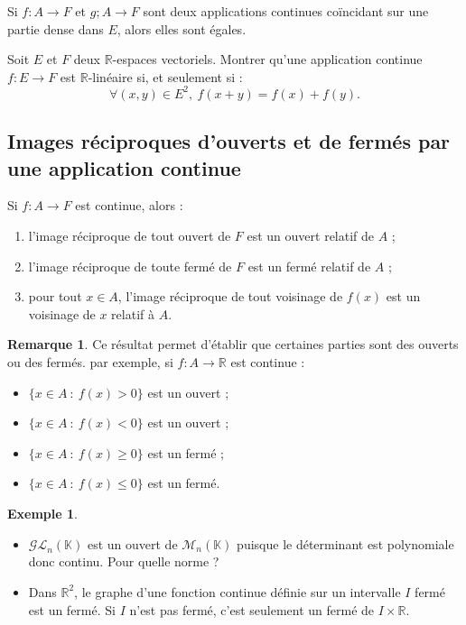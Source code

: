 \documentclass[french]{article}
\newcommand{\R}{\mathbb{R}}
\newcommand{\K}{\mathbb{K}}
\theoremstyle{plain}
\theoremstyle{definition}
\newtheorem*{ex}{Exemple}
\newtheorem*{rmq}{Remarque}
\theoremstyle{remark}
\begin{document}
\begin{prop}%
	Si $f:A\to F$ et $g;A\to F$ sont deux applications continues coïncidant sur une partie dense dans $E$, alors elles sont égales.
\end{prop}

\begin{exo}
	Soit $E$ et $F$ deux $\R$-espaces vectoriels. Montrer qu'une application continue $f:E\to F$ est $\R$-linéaire si, et seulement si : $$\forall (x,y)\in E^2,\ f(x+y)=f(x)+f(y).$$
\end{exo}

\subsection{Images réciproques d'ouverts et de fermés par une application continue}

\begin{thm}
	Si $f:A\to F$ est continue, alors :
	\begin{enumerate}[label=(\roman*)]
		\item l'image réciproque de tout ouvert de $F$ est un ouvert relatif de $A$ ;
		\item l'image réciproque de toute fermé de $F$ est un fermé relatif de $A$ ;
		\item pour tout $x\in A$, l'image réciproque de tout voisinage de $f(x)$ est un voisinage de $x$ relatif à $A$.
	\end{enumerate}
\end{thm}

\begin{rmq}
	Ce résultat permet d'établir que certaines parties sont des ouverts ou des fermés. par exemple, si $f:A\to\R$ est continue :
	\begin{itemize}
		\item $\{x\in A\ : \ f(x)>0\}$ est un ouvert ;
		\item $\{x\in A\ : \ f(x)<0\}$ est un ouvert ;
		\item $\{x\in A\ : \ f(x)\geqslant0\}$ est un fermé ;
		\item $\{x\in A\ : \ f(x)\leqslant0\}$ est un fermé.
	\end{itemize}
\end{rmq}

\begin{ex}
	\begin{itemize}
		\item $\mathcal{GL}_n(\K)$ est un ouvert de $\mathcal{M}_n(\K)$ puisque le déterminant est polynomiale donc continu. Pour quelle norme ?
		\item Dans $\R^2$, le graphe d'une fonction continue définie sur un intervalle $I$ fermé est un fermé. Si $I$ n'est pas fermé, c'est seulement un fermé de $I\times\R$.
	\end{itemize}	
\end{ex}
\end{document}
